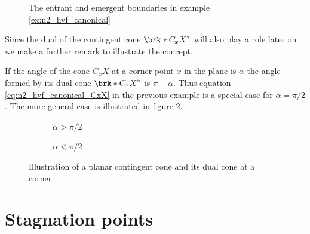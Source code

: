 \begin{figure}
  \centering
  
  \caption{The entrant and emergent boundaries in 
  example \eqref{ex:n2_hvf_canonical}}
  \label{pl:n2_hvf_canonical_boundary}
\end{figure}

Since the dual of the contingent cone $\brk*{C_xX}^*$ will also play a role later on we make a
further remark to illustrate the concept.
\begin{remark}
  If the angle of the cone $C_xX$ at a corner point $x$ in the plane is $\alpha$ the angle formed by its dual
  cone $\brk*{C_xX}^*$ is $\pi-\alpha$.
  Thus equation \eqref{eq:n2_hvf_canonical_CxX} in the previous example is a special case for $\alpha=\pi/2$.
  The more general case is illustrated in figure \ref{fi:n2_contingentCone_greaterLess}.
  \begin{figure}
    \centering
    \begin{subfigure}{0.45\textwidth}
      \centering
      
      \caption{$\alpha>\pi/2$}
    \end{subfigure}
    \hfill
    \begin{subfigure}{0.45\textwidth}
      \centering
      
      \caption{$\alpha<\pi/2$}
    \end{subfigure}
    \caption{Illustration of a planar contingent cone and its dual cone at a corner.}
    \label{fi:n2_contingentCone_greaterLess}
  \end{figure}
\end{remark}

\section{Stagnation points}

